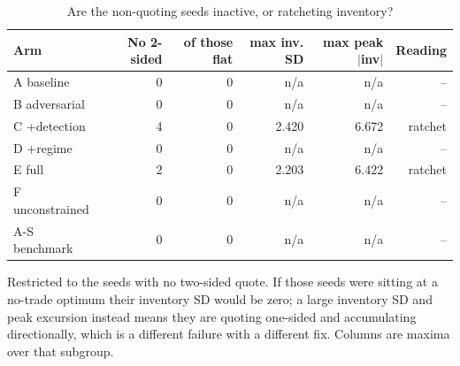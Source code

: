 \begin{table}[htbp]
  \centering
  \caption{Are the non-quoting seeds inactive, or ratcheting inventory?}
  \label{tab:inventory}
  \begin{tabular}{lrrrrr}
    \toprule
    Arm & No 2-sided & of those flat & max inv. SD & max peak $|$inv$|$ & Reading \\
    \midrule
    A  baseline & 0 & 0 & n/a & n/a & -- \\
    B  adversarial & 0 & 0 & n/a & n/a & -- \\
    C  +detection & 4 & 0 & 2.420 & 6.672 & ratchet \\
    D  +regime & 0 & 0 & n/a & n/a & -- \\
    E  full & 2 & 0 & 2.203 & 6.422 & ratchet \\
    F  unconstrained & 0 & 0 & n/a & n/a & -- \\
    A-S benchmark & 0 & 0 & n/a & n/a & -- \\
    \bottomrule
  \end{tabular}
  \begin{minipage}{\linewidth}\vspace{4pt}\footnotesize Restricted to the seeds with no two-sided quote. If those seeds were sitting at a no-trade optimum their inventory SD would be zero; a large inventory SD and peak excursion instead means they are quoting one-sided and accumulating directionally, which is a different failure with a different fix. Columns are maxima over that subgroup.\end{minipage}
\end{table}
